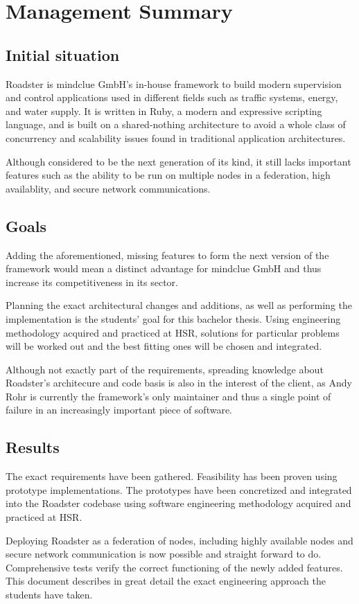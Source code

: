 \part{Management Summary}\label{part:mgmtsummary}
\chapter*{Initial situation}
Roadster is mindclue GmbH's in-house framework to build modern supervision and
control applications used in different fields such as traffic systems, energy,
and water supply. It is written in Ruby, a modern and expressive scripting
language, and is built on a shared-nothing architecture to avoid a whole class
of concurrency and scalability issues found in traditional application
architectures.

Although considered to be the next generation of its kind, it still lacks
important features such as the ability to be run on multiple
nodes in a federation, high availablity, and secure network communications.

\chapter*{Goals}
Adding the aforementioned, missing features to form the next version of the
framework would mean a distinct advantage for mindclue GmbH and thus increase
its competitiveness in its sector.

Planning the exact architectural changes and additions, as well as performing
the implementation is the students' goal for this bachelor thesis. Using
engineering methodology acquired and practiced at HSR, solutions for particular problems
will be worked out and the best fitting ones will be chosen and integrated.

Although not exactly part of the requirements, spreading knowledge about Roadster's
architecure and code basis is also in the interest of the client, as Andy Rohr
is currently the framework's only maintainer and thus a single point of failure
in an increasingly important piece of software.

\chapter*{Results}
The exact requirements have been gathered. Feasibility has been proven using
prototype implementations. The prototypes have been concretized and integrated
into the Roadster codebase using software engineering methodology acquired and
practiced at HSR.

Deploying Roadster as a federation of nodes, including highly available nodes
and secure network communication is now possible and straight forward to do.
Comprehensive tests verify the correct functioning of the newly added features.
This document describes in great detail the exact engineering approach the
students have taken.
